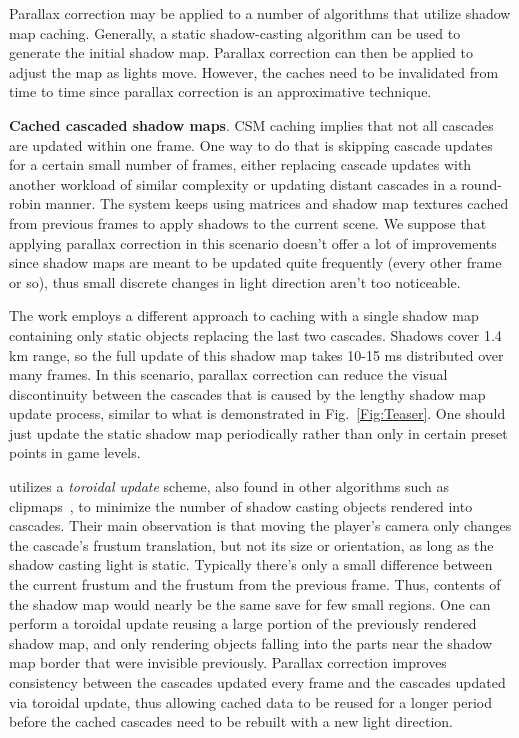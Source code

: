 Parallax correction may be applied to a number of algorithms that utilize 
shadow map caching. 
Generally, a static shadow-casting algorithm can be used to generate the initial shadow
map. Parallax correction can then be applied to adjust the map as lights move.
However, the caches need to be invalidated from time to time since 
parallax correction is an approximative technique.

\bigskip
\textbf{Cached cascaded shadow maps}. CSM
caching implies that not all cascades are updated within one frame. One way
to do that is skipping cascade updates for a certain small number of frames, either 
replacing cascade updates with another workload of similar complexity or 
updating distant cascades in a round-robin manner. The system keeps using 
matrices and shadow map textures cached from previous frames to apply shadows to
the current scene. We suppose that applying parallax correction in this scenario 
doesn't offer a lot of improvements since shadow maps are meant to be updated 
quite frequently (every other frame or so), thus small 
discrete changes in light direction aren't too noticeable.

The work \cite{CrytekRyse} employs a different approach to caching with a single shadow 
map containing only static objects replacing the last two cascades. Shadows
cover 1.4 km range, so the full update of this shadow map takes 10-15 ms 
distributed over many frames. In this scenario, parallax correction can reduce the visual 
discontinuity between the cascades that
is caused by the lengthy shadow map update process, similar to what is
demonstrated in Fig.~\ref{Fig:Teaser}. One should just update the static shadow map 
periodically rather than only in certain preset points in game levels.

\cite{CSMScrolling} utilizes a \textit{toroidal update} scheme, also found in other 
algorithms such as clipmaps~\cite{ToroidalUpdate}, to minimize the number of shadow casting objects 
rendered into cascades. Their main observation is that moving the player's camera only 
changes the cascade's frustum translation, but not its size or orientation, 
as long as the shadow casting light is static. Typically there's only a small difference 
between the current frustum and the frustum from the previous frame. Thus, 
contents of the shadow map would nearly be the same save for few 
small regions. One can perform a toroidal update reusing a large 
portion of the previously rendered shadow map, and only rendering objects 
falling into the parts near the shadow map border that were invisible previously. Parallax 
correction improves consistency between the cascades updated every frame 
and the cascades updated via toroidal update, thus allowing cached data to 
be reused for a longer period before the cached cascades need to be
rebuilt with a new light direction.

